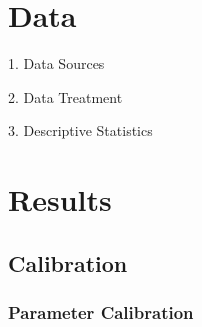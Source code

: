 \documentclass[
	12pt, 
	]{article}
\numberwithin{equation}{section}
\theoremstyle{definition}
\theoremstyle{plain}
\theoremstyle{plain}
\theoremstyle{plain}
\begin{document}


\newpage


\section{Data}

\lipsum[1]

1. Data Sources

2. Data Treatment

3. Descriptive Statistics


\section{Results}

\lipsum[1]

\subsection{Calibration}


\subsubsection{Parameter Calibration}

\vspace*{-1cm}
\end{document}
